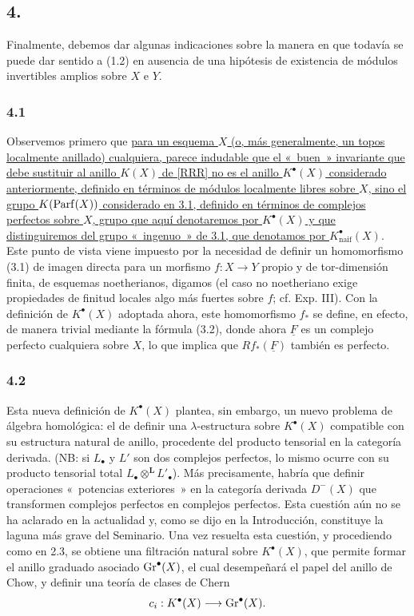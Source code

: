 
\subsection*{4.}
Finalmente, debemos dar algunas indicaciones sobre la manera en que todavía
se puede dar sentido a (1.2) en ausencia de una hipótesis de existencia de
módulos invertibles amplios sobre $X$ e $Y$.

\subsubsection*{4.1}
Observemos primero que \uline{para un esquema $X$ (o, más generalmente, un
topos localmente anillado) cualquiera, parece indudable que el «~buen~»
invariante que debe sustituir al anillo $K(X)$ de [RRR] no es el anillo
$K^\bullet(X)$ considerado anteriormente, definido en términos de módulos
localmente libres sobre $X$, sino el grupo $K(\operatorname{Parf}(X))$ considerado en 3.1,
definido en términos de complejos perfectos sobre $X$, grupo que aquí
denotaremos por $K^\bullet(X)$ y que distinguiremos del grupo «~ingenuo~» de
3.1, que denotamos por $K^\bullet_{\mathrm{naif}}(X)$}. Este punto de vista
viene impuesto por la necesidad de definir un homomorfismo (3.1) de imagen
directa para un morfismo $f:X\to Y$ propio y de tor-dimensión finita, de
esquemas noetherianos, digamos (el caso no noetheriano exige propiedades de
finitud locales algo más fuertes sobre $f$; cf. Exp. III). Con la definición
de $K^\bullet(X)$ adoptada ahora, este homomorfismo $f_*$ se define, en
efecto, de manera trivial mediante la fórmula (3.2), donde ahora
$\underline F$ es un complejo perfecto cualquiera sobre $X$, lo que implica
que $Rf_*(\underline F)$ también es perfecto.

\subsubsection*{4.2}
Esta nueva definición de $K^\bullet(X)$ plantea, sin embargo, un nuevo
problema de álgebra homológica: el de definir una $\lambda$-estructura sobre
$K^\bullet(X)$ compatible con su estructura natural de anillo, procedente
del producto tensorial en la categoría derivada. (NB: si $L_\bullet$ y $L'$
son dos complejos perfectos, lo mismo ocurre con su producto tensorial total
$L_\bullet\otimes^{\mathbf L}L'_\bullet$). Más precisamente, habría que definir
operaciones «~potencias exteriores~» en la categoría derivada $D^-(X)$ que
transformen complejos perfectos en complejos perfectos. Esta cuestión aún no
se ha aclarado en la actualidad y, como se dijo en la Introducción,
constituye la laguna más grave del Seminario. Una vez resuelta esta cuestión,
y procediendo como en 2.3, se obtiene una filtración natural sobre
$K^\bullet(X)$, que permite formar el anillo graduado asociado
$\operatorname{Gr}^\bullet(X)$, el cual desempeñará el papel del anillo de Chow, y definir
una teoría de clases de Chern
\[
c_i:K^\bullet(X)\longrightarrow \operatorname{Gr}^\bullet(X).
\]


